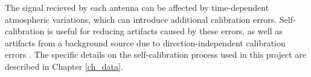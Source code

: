 The signal recieved by each antenna can be affected by time-dependent atmospheric variations, which can introduce additional calibration errors. Self-calibration is useful for reducing artifacts caused by these errors, as well as artifacts from a background source due to direction-independent calibration errors \citep{Marvil2}. The specific details on the self-calibration process used in this project are described in Chapter \ref{ch_data}. 





















